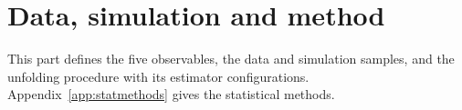 \section{Data, simulation and method}
\label{sec:part-method}

This part defines the five observables, the data and simulation samples, and the unfolding procedure with its estimator configurations. Appendix~\ref{app:statmethods} gives the statistical methods.




